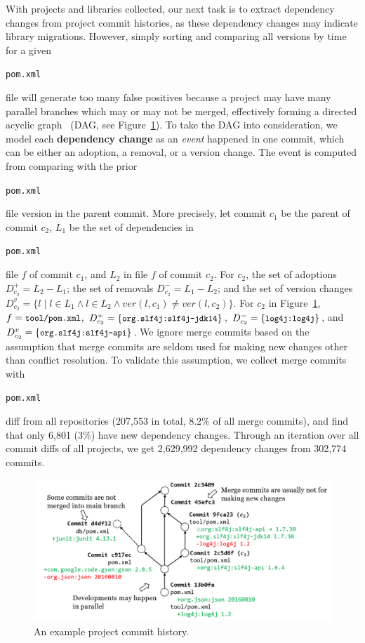 \documentclass[sigconf, screen]{acmart}
\newcommand{\Code}[1]{\begin{small}\texttt{#1}\end{small}}
\begin{document}
With projects and libraries collected, our next task is to extract dependency changes from project commit histories, as these dependency changes may indicate library migrations.
However, simply sorting and comparing all versions by time for a given \Code{pom.xml} file will generate too many false positives because a project may have many parallel branches which may or may not be merged, effectively forming a directed acyclic graph~\cite{bird2009promises} (DAG, see Figure~\ref{fig:gitdag}).
To take the DAG into consideration, we model each \textbf{dependency change} as an \textit{event} happened in one commit, which can be either an adoption, a removal, or a version change.
The event is computed from comparing with the prior \Code{pom.xml} file version in the parent commit.
More precisely, let commit $c_1$ be the parent of commit $c_2$, $L_1$ be the set of dependencies in \Code{pom.xml} file $f$ of commit $c_1$, and $L_2$ in file $f$ of commit $c_2$.
For $c_2$, the set of adoptions $D^+_{c_2}=L_2 - L_1$; the set of removals $D^-_{c_2}=L_1 - L_2$; and the set of version changes $D^v_{c_2} = \{ l \mid l \in L_1  \land l \in L_2 \land ver(l, c_1) \ne ver(l,c_2)\}$.
For $c_2$ in Figure~\ref{fig:gitdag}, $f=\text{\Code{tool/pom.xml}}$, $D_{c_2}^+=\{ \text{\Code{org.slf4j:slf4j-jdk14}}\}$, $D_{c_2}^-=\{ \text{\Code{log4j:log4j}} \}$, and $D_{c_2}^v=\{ \text{\Code{org.slf4j:slf4j-api}} \}$.
We ignore merge commits based on the assumption that merge commits are seldom used for making new changes other than conflict resolution.
To validate this assumption, we collect merge commits with \Code{pom.xml} diff from all repositories (207,553 in total, 8.2\% of all merge commits), and find that only 6,801 (3\%) have new dependency changes.
Through an iteration over all commit diffs of all projects, we get 2,629,992 dependency changes from 302,774 commits.

\begin{figure}[t]
  \centering
  \includegraphics[width=0.9\linewidth]{fig/git-dag.png}
\vspace{-3mm}
  \caption{An example project commit history.}
  \label{fig:gitdag}
\vspace{-2mm}
\end{figure}
\end{document}
